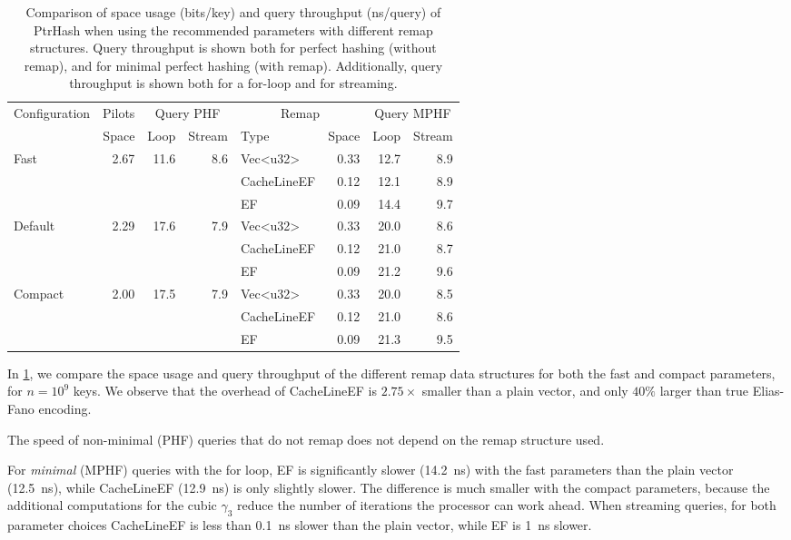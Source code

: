\documentclass[a4paper,UKenglish,cleveref,thm-restate]{lipics-v2021}
\begin{document}
\begin{table}[t]
\caption{\label{remap}Comparison of space usage (bits/key) and query throughput
  (ns/query) of PtrHash when using the recommended parameters with different remap structures. Query throughput is shown both for perfect hashing (without remap), and for minimal perfect hashing (with remap). Additionally, query throughput is shown both for a for-loop and for streaming.}
\centering
\setlength{\tabcolsep}{5pt}
\begin{tabular}{lrrrlrrr}
\toprule
Configuration & Pilots & \multicolumn{2}{c}{Query PHF} & \multicolumn{2}{c}{Remap} &
\multicolumn{2}{c}{Query MPHF} \\
\cmidrule(lr){3-4}
\cmidrule(lr){5-6}
\cmidrule(lr){7-8}
 & Space & Loop & Stream & Type & \hspace{-4em} Space& Loop & Stream\\
\midrule
Fast & 2.67 & 11.6 & 8.6 & Vec<u32> & 0.33 & 12.7 & 8.9\\
 &  &  &  & CacheLineEF & 0.12 & 12.1 & 8.9\\
 &  &  &  & EF & 0.09 & 14.4 & 9.7\\
\midrule
Default & 2.29 & 17.6 & 7.9 & Vec<u32> & 0.33 & 20.0 & 8.6\\
 &  &  &  & CacheLineEF & 0.12 & 21.0 & 8.7\\
 &  &  &  & EF & 0.09 & 21.2 & 9.6\\
\midrule
Compact & 2.00 & 17.5 & 7.9 & Vec<u32> & 0.33 & 20.0 & 8.5\\
 &  &  &  & CacheLineEF & 0.12 & 21.0 & 8.6\\
 &  &  &  & EF & 0.09 & 21.3 & 9.5\\
\bottomrule
\end{tabular}
\end{table}

In \cref{remap}, we compare the space usage and query throughput of the different remap
data structures for both the fast and compact parameters, for \(n=10^9\) keys. We observe that
the overhead of CacheLineEF is \(2.75\times\) smaller than a plain vector, and only \(40\%\) larger
than true Elias-Fano encoding.

The speed of non-minimal (PHF) queries that do not remap does not depend
on the remap structure used.

For \emph{minimal} (MPHF) queries with the for loop, EF is significantly slower
(14.2~ns) with the fast parameters than the plain vector (12.5~ns), while
CacheLineEF (12.9~ns) is only slightly slower.
The difference is much smaller with the compact parameters, because the
additional computations for the cubic \(\gamma_3\) reduce the number of iterations
the processor can work ahead.
When streaming queries, for both parameter choices CacheLineEF is less than 0.1~ns slower than the
plain vector, while EF is 1~ns slower.
\end{document}
